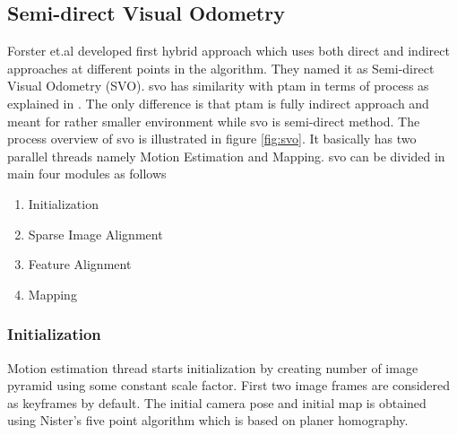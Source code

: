 \subsection{Semi-direct Visual Odometry}
Forster et.al developed first hybrid approach which uses both direct and indirect approaches at different points in the algorithm. They named it as Semi-direct Visual Odometry (SVO). \acrshort{svo} has similarity with \acrshort{ptam} in terms of process as explained in \cite{4538852}. The only difference is that \acrshort{ptam} is fully indirect approach and meant for rather smaller environment while \acrshort{svo} is semi-direct method. The process overview of \acrshort{svo} is illustrated in figure \ref{fig:svo}. It basically has two parallel threads namely Motion Estimation and Mapping. \acrshort{svo} can be divided in main four modules as follows 
\begin{enumerate}
	\item Initialization
	\item Sparse Image Alignment
	\item Feature Alignment
	\item Mapping
\end{enumerate}
\subsubsection{Initialization}
Motion estimation thread starts initialization by creating number of image pyramid using some constant scale factor. First two image frames are considered as keyframes by default. The initial camera pose and initial map is obtained using Nister's five point algorithm \cite{Nister} which is based on planer homography.\\
